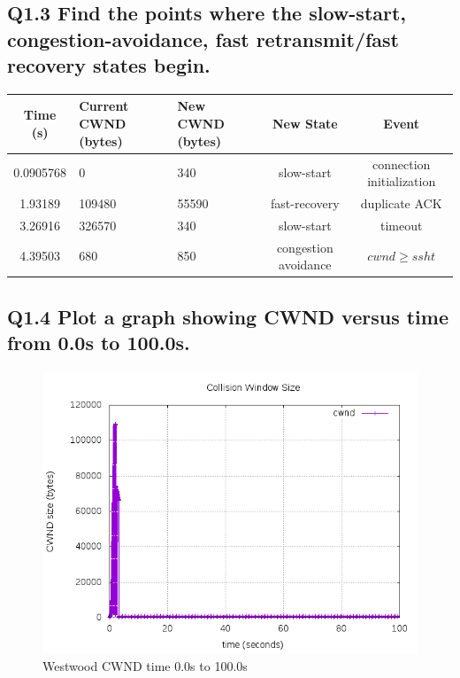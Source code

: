 \documentclass{article}
\begin{document}
\subsection{Q1.3 Find the points where the slow-start,
congestion-avoidance, fast retransmit/fast recovery states begin.}

\begin{table}[H]
\centering
\begin{tabular}{|c|p{25mm}|p{20mm}|c|c|}
\hline Time (s)    & Current CWND (bytes)    & New CWND (bytes)    & New State    & Event \\
\hline 0.0905768   & 0                       & 340          & slow-start          & connection initialization\\
\hline 1.93189     & 109480                  & 55590        & fast-recovery       & duplicate ACK\\
\hline 3.26916     & 326570                  & 340          & slow-start          & timeout\\ 
\hline 4.39503     & 680                     & 850          & congestion avoidance   & $cwnd \geq ssht$ \\
\hline  
\end{tabular} 
\end{table}


\subsection{Q1.4 Plot a graph showing CWND versus time from 0.0s to
100.0s.}


\begin{figure}[H]
\centering
\includegraphics[width=12cm]{figures/cwndWestwood.png}
\caption{Westwood CWND time 0.0s to 100.0s}
\end{figure}
\end{document}
